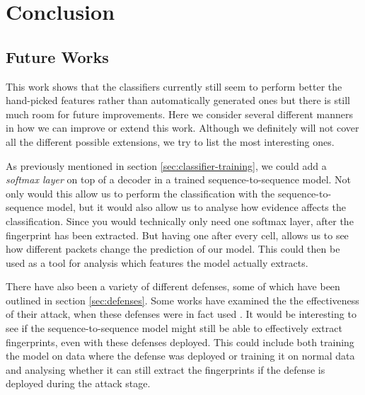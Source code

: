 \chapter{Conclusion}



\section{Future Works} \label{sec:future-works}

This work shows that the classifiers currently still seem to perform better the hand-picked features rather than automatically generated ones but there is still much room for future improvements.
Here we consider several different manners in how we can improve or extend this work.
Although we definitely will not cover all the different possible extensions, we try to list the most interesting ones.

As previously mentioned in section \ref{sec:classifier-training}, we could add a \textit{softmax layer} on top of a decoder in a trained sequence-to-sequence model.
Not only would this allow us to perform the classification with the sequence-to-sequence model, but it would also allow us to analyse how evidence affects the classification.
Since you would technically only need one softmax layer, after the fingerprint has been extracted.
But having one after every cell, allows us to see how different packets change the prediction of our model.
This could then be used as a tool for analysis which features the model actually extracts.

There have also been a variety of different defenses, some of which have been outlined in section \ref{sec:defenses}.
Some works have examined the the effectiveness of their attack, when these defenses were in fact used \cite{kfingerprinting,wang_cai_johnson_nithyanand_goldberg_2014}.
It would be interesting to see if the sequence-to-sequence model might still be able to effectively extract fingerprints, even with these defenses deployed.
This could include both training the model on data where the defense was deployed or training it on normal data and analysing whether it can still extract the fingerprints if the defense is deployed during the attack stage.

